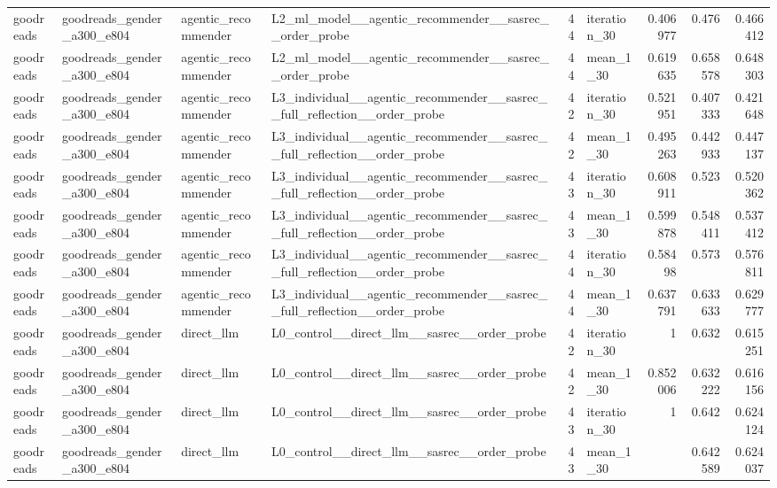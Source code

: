 \begin{table}[htbp!]
\begin{tabular}{llllrlrrr}
goodreads & goodreads\_gender\_a300\_e804 & agentic\_recommender & L2\_ml\_model\_\_agentic\_recommender\_\_sasrec\_\_order\_probe & 44 & iteration\_30 & 0.406977 & 0.476 & 0.466412 \\
goodreads & goodreads\_gender\_a300\_e804 & agentic\_recommender & L2\_ml\_model\_\_agentic\_recommender\_\_sasrec\_\_order\_probe & 44 & mean\_1\_30 & 0.619635 & 0.658578 & 0.648303 \\
goodreads & goodreads\_gender\_a300\_e804 & agentic\_recommender & L3\_individual\_\_agentic\_recommender\_\_sasrec\_\_full\_reflection\_\_order\_probe & 42 & iteration\_30 & 0.521951 & 0.407333 & 0.421648 \\
goodreads & goodreads\_gender\_a300\_e804 & agentic\_recommender & L3\_individual\_\_agentic\_recommender\_\_sasrec\_\_full\_reflection\_\_order\_probe & 42 & mean\_1\_30 & 0.495263 & 0.442933 & 0.447137 \\
goodreads & goodreads\_gender\_a300\_e804 & agentic\_recommender & L3\_individual\_\_agentic\_recommender\_\_sasrec\_\_full\_reflection\_\_order\_probe & 43 & iteration\_30 & 0.608911 & 0.523 & 0.520362 \\
goodreads & goodreads\_gender\_a300\_e804 & agentic\_recommender & L3\_individual\_\_agentic\_recommender\_\_sasrec\_\_full\_reflection\_\_order\_probe & 43 & mean\_1\_30 & 0.599878 & 0.548411 & 0.537412 \\
goodreads & goodreads\_gender\_a300\_e804 & agentic\_recommender & L3\_individual\_\_agentic\_recommender\_\_sasrec\_\_full\_reflection\_\_order\_probe & 44 & iteration\_30 & 0.58498 & 0.573 & 0.576811 \\
goodreads & goodreads\_gender\_a300\_e804 & agentic\_recommender & L3\_individual\_\_agentic\_recommender\_\_sasrec\_\_full\_reflection\_\_order\_probe & 44 & mean\_1\_30 & 0.637791 & 0.633633 & 0.629777 \\
goodreads & goodreads\_gender\_a300\_e804 & direct\_llm & L0\_control\_\_direct\_llm\_\_sasrec\_\_order\_probe & 42 & iteration\_30 & 1 & 0.632 & 0.615251 \\
goodreads & goodreads\_gender\_a300\_e804 & direct\_llm & L0\_control\_\_direct\_llm\_\_sasrec\_\_order\_probe & 42 & mean\_1\_30 & 0.852006 & 0.632222 & 0.616156 \\
goodreads & goodreads\_gender\_a300\_e804 & direct\_llm & L0\_control\_\_direct\_llm\_\_sasrec\_\_order\_probe & 43 & iteration\_30 & 1 & 0.642 & 0.624124 \\
goodreads & goodreads\_gender\_a300\_e804 & direct\_llm & L0\_control\_\_direct\_llm\_\_sasrec\_\_order\_probe & 43 & mean\_1\_30 & \textemdash{} & 0.642589 & 0.624037 \\

\end{tabular}
\end{table}

